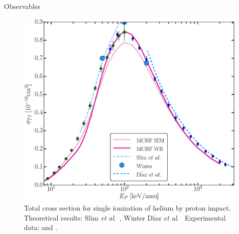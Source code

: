 \documentclass[letterpaper, 12 pt]{report}
\begin{document}
\begin{chapter}{Observables \label{chap:p-he2p-he}}
\begin{figure}[htp]
   \centering
   \includegraphics[width = \linewidth]{./images/phe/phe-TI.eps}
   \caption[Total cross section for single ionization of helium by proton impact.]
           {Total cross section for single ionization of helium by proton impact.
            Theoretical results: Slim \textit{et al}.\ \cite{SHBF-91}, Winter \cite{Winter-91}
            D\'{i}az \textit{et al}.\ \cite{DMS-00}
            Experimental data: {\color{OliveGreen}{$\bullet$}} \cite{SG89} and
            {\color{blue}{$\blacklozenge$}} \cite{SG85}. \label{fig:phe-ti}}
\end{figure}


\end{chapter}
\end{document}
